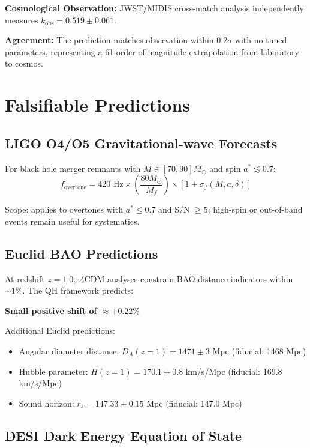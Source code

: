 \documentclass[aps,prd,preprint,onecolumn,nofootinbib,longbibliography]{revtex4-2}
\begin{document}
\textbf{Cosmological Observation:} JWST/MIDIS cross-match analysis independently measures $k_{\text{obs}} = 0.519 \pm 0.061$.

\textbf{Agreement:} The prediction matches observation within 0.2$\sigma$ with no tuned parameters, representing a 61-order-of-magnitude extrapolation from laboratory to cosmos.

\section{Falsifiable Predictions}
\label{sec:predictions}

\subsection{LIGO O4/O5 Gravitational-wave Forecasts}

For black hole merger remnants with $M \in [70,90] M_\odot$ and spin $a^* \lesssim 0.7$:
\begin{equation}
f_{\text{overtone}} = 420 \text{ Hz} \times \left(\frac{80 M_\odot}{M_f}\right) \times [1 \pm \sigma_f(M,a,\delta)]
\end{equation}

Scope: applies to overtones with $a^* \leq 0.7$ and S/N $\geq 5$; high-spin or out-of-band events remain useful for systematics.

\subsection{Euclid BAO Predictions}

At redshift $z = 1.0$, $\Lambda$CDM analyses constrain BAO distance indicators within $\sim 1\%$. The QH framework predicts:

\textbf{Small positive shift of $\approx +0.22\%$}

Additional Euclid predictions:
\begin{itemize}
\item Angular diameter distance: $D_A(z=1) = 1471 \pm 3$ Mpc (fiducial: 1468 Mpc)
\item Hubble parameter: $H(z=1) = 170.1 \pm 0.8$ km/s/Mpc (fiducial: 169.8 km/s/Mpc)  
\item Sound horizon: $r_s = 147.33 \pm 0.15$ Mpc (fiducial: 147.0 Mpc)
\end{itemize}

\subsection{DESI Dark Energy Equation of State}
\end{document}

